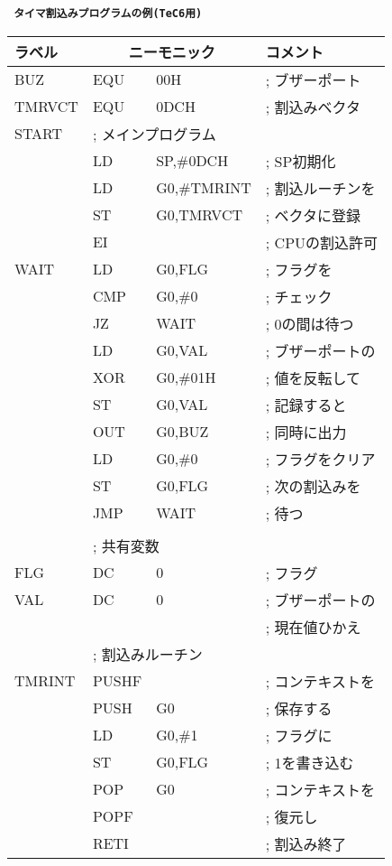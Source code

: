 \begin{center}
{\small\tt
{\bf タイマ割込みプログラムの例(TeC6用)}
\begin{tabular}{|l|l l l|} \hline
ラベル & \multicolumn{2}{|c}{ニーモニック} & コメント\\
\hline
BUZ   & EQU   & 00H               & ; ブザーポート   \\
TMRVCT& EQU   & 0DCH              & ; 割込みベクタ   \\
START & \multicolumn{3}{|l|}{; メインプログラム}     \\
      & LD    & SP,\#0DCH         & ; SP初期化       \\
      & LD    & G0,\#TMRINT       & ; 割込ルーチンを \\
      & ST    & G0,TMRVCT         & ; ベクタに登録   \\
      & EI    &                   & ; CPUの割込許可  \\
WAIT  & LD    & G0,FLG            & ; フラグを       \\
      & CMP   & G0,\#0            & ;   チェック     \\
      & JZ    & WAIT              & ; 0の間は待つ    \\
      & LD    & G0,VAL            & ; ブザーポートの \\
      & XOR   & G0,\#01H          & ;   値を反転して \\
      & ST    & G0,VAL            & ;   記録すると   \\
      & OUT   & G0,BUZ            & ;   同時に出力   \\
      & LD    & G0,\#0            & ; フラグをクリア \\
      & ST    & G0,FLG            & ; 次の割込みを   \\
      & JMP   & WAIT              & ;   待つ         \\
      &       &                   &                  \\
      & \multicolumn{3}{|l|}{; 共有変数}             \\
FLG   & DC    & 0                 & ; フラグ         \\
VAL   & DC    & 0                 & ; ブザーポートの \\
      &       &                   & ;   現在値ひかえ \\
      & \multicolumn{3}{|l|}{; 割込みルーチン}       \\
TMRINT& PUSHF &                   & ; コンテキストを \\
      & PUSH  & G0                & ;   保存する     \\
      & LD    & G0,\#1            & ; フラグに       \\
      & ST    & G0,FLG            & ;   1を書き込む  \\
      & POP   & G0                & ; コンテキストを \\
      & POPF  &                   & ;   復元し       \\
      & RETI  &                   & ; 割込み終了     \\
\hline
\end{tabular}
}
\end{center}

